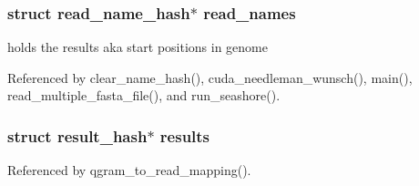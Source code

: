 \subsubsection[{read\_\-names}]{\setlength{\rightskip}{0pt plus 5cm}struct {\bf read\_\-name\_\-hash}$\ast$ {\bf read\_\-names}}\label{cuda-functions_8h_0aa4bc36df5f7c54e3b8663dfd3b40ca}


holds the results aka start positions in genome 

Referenced by clear\_\-name\_\-hash(), cuda\_\-needleman\_\-wunsch(), main(), read\_\-multiple\_\-fasta\_\-file(), and run\_\-seashore().
\subsubsection[{results}]{\setlength{\rightskip}{0pt plus 5cm}struct {\bf result\_\-hash}$\ast$ {\bf results}}\label{cuda-functions_8h_e16708cde6a9a3d6c5432b4f1bf701d0}




Referenced by qgram\_\-to\_\-read\_\-mapping().